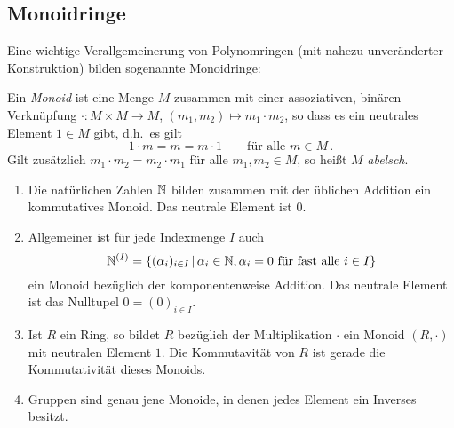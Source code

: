 \subsection*{Monoidringe}

Eine wichtige Verallgemeinerung von Polynomringen (mit nahezu unveränderter Konstruktion) bilden sogenannte Monoidringe:

\begin{definition}
  Ein \emph{Monoid} ist eine Menge $M$ zusammen mit einer assoziativen, binären Verknüpfung $\cdot \colon M \times M \to M$, $(m_1, m_2) \mapsto m_1 \cdot m_2$, so dass es ein neutrales Element $1 \in M$ gibt, d.h.\ es gilt
  \[
      1 \cdot m
    = m
    = m \cdot 1
    \qquad
    \text{für alle $m \in M$} \,.
  \]
  Gilt zusätzlich $m_1 \cdot m_2 = m_2 \cdot m_1$ für alle $m_1, m_2 \in M$, so heißt $M$ \emph{abelsch}.
\end{definition}

\begin{example}
  \leavevmode
  \begin{enumerate}
    \item
      Die natürlichen Zahlen $\mathbb{N}$ bilden zusammen mit der üblichen Addition ein kommutatives Monoid.
      Das neutrale Element ist $0$.
    \item
      Allgemeiner ist für jede Indexmenge $I$ auch
      \[
          \Natural^{(I)}
        = \{
            (\alpha_i)_{i \in I}
          \suchthat
            \alpha_i \in \Natural,
            \text{$\alpha_i = 0$ für fast alle $i \in I$}
          \}
      \]
      ein Monoid bezüglich der komponentenweise Addition.
      Das neutrale Element ist das Nulltupel $0 = (0)_{i \in I}$.
    \item
      Ist $R$ ein Ring, so bildet $R$ bezüglich der Multiplikation $\cdot$ ein Monoid $(R,\cdot)$ mit neutralen Element $1$.
      Die Kommutavität von $R$ ist gerade die Kommutativität dieses Monoids.
    \item
      Gruppen sind genau jene Monoide, in denen jedes Element ein Inverses besitzt.
  \end{enumerate}
\end{example}


